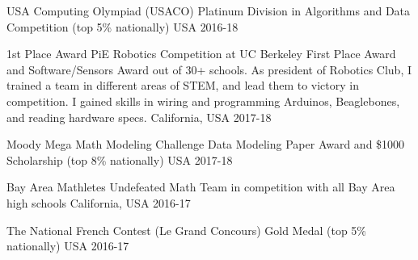 



\begin{cvhonors}
  
  \cvhonor
    {USA Computing Olympiad (USACO)} %
    {Platinum Division in Algorithms and Data Competition (top 5\% nationally)}
    {USA} %
    {2016-18} %
    
  \cvhonor
    {1st Place Award PiE Robotics Competition at UC Berkeley}  %
    {First Place Award and Software/Sensors Award out of 30+ schools. As president of Robotics Club, I trained a team in different areas of STEM, and lead them to victory in competition. I gained skills in wiring and programming Arduinos, Beaglebones, and reading hardware specs.}
    {California, USA} %
    {2017-18} %

  \cvhonor
    {Moody Mega Math Modeling Challenge} %
    {Data Modeling Paper Award and \$1000 Scholarship (top 8\% nationally)}
    {USA} %
    {2017-18} %
 
  \cvhonor
    {Bay Area Mathletes} %
    {Undefeated Math Team in competition with all Bay Area high schools}
    {California, USA} %
    {2016-17} %

  \cvhonor
    {The National French Contest (Le Grand Concours)} %
    {Gold Medal (top 5\% nationally)}
    {USA} %
    {2016-17} %
      
\end{cvhonors}
